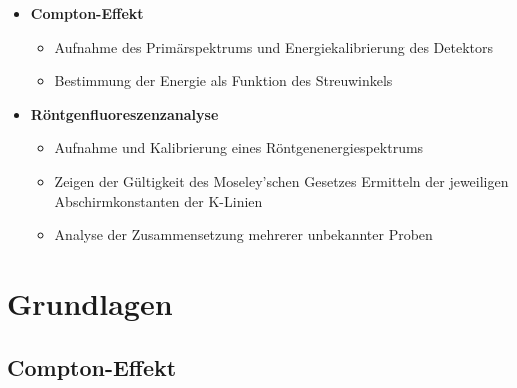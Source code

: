 \documentclass[ngerman]{scrartcl}
\begin{document}
\begin{itemize}
    \item \textbf{Compton-Effekt}
          \begin{itemize}
              \item Aufnahme des Primärspektrums und Energiekalibrierung des Detektors
              \item Bestimmung der Energie als Funktion des Streuwinkels
          \end{itemize}
    \item \textbf{Röntgenfluoreszenzanalyse}
          \begin{itemize}
              \item Aufnahme und Kalibrierung eines Röntgenenergiespektrums
              \item Zeigen der Gültigkeit des Moseley'schen Gesetzes Ermitteln der jeweiligen Abschirmkonstanten der K-Linien
              \item Analyse der Zusammensetzung mehrerer unbekannter Proben
          \end{itemize}
\end{itemize}


\section{Grundlagen}
\label{sec:grundlagen}

\subsection[Compton-Effekt]{Compton-Effekt \cite{ref:angabe_compton}}
\label{subsec:grundlagen_compton}
\end{document}
